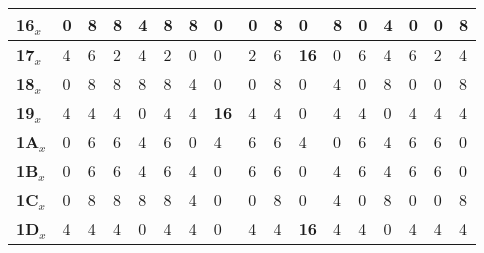 \begin{longtable}[c]{|l|l|l|l|l|l|l|l|l|l|l|l|l|l|l|l|l|}
\textbf{16$_x$} & 0              & 8              & 8              & 4              & 8              & 8              & 0              & 0              & 8              & 0              & 8              & 0              & 4              & 0              & 0              & 8              \\ \hline
\textbf{17$_x$} & 4              & 6              & 2              & 4              & 2              & 0              & 0              & 2              & 6              & \textbf{16}             & 0              & 6              & 4              & 6              & 2              & 4              \\ \hline
\textbf{18$_x$} & 0              & 8              & 8              & 8              & 8              & 4              & 0              & 0              & 8              & 0              & 4              & 0              & 8              & 0              & 0              & 8              \\ \hline
\textbf{19$_x$} & 4              & 4              & 4              & 0              & 4              & 4              & \textbf{16}             & 4              & 4              & 0              & 4              & 4              & 0              & 4              & 4              & 4              \\ \hline
\textbf{1A$_x$} & 0              & 6              & 6              & 4              & 6              & 0              & 4              & 6              & 6              & 4              & 0              & 6              & 4              & 6              & 6              & 0              \\ \hline
\textbf{1B$_x$} & 0              & 6              & 6              & 4              & 6              & 4              & 0              & 6              & 6              & 0              & 4              & 6              & 4              & 6              & 6              & 0              \\ \hline
\textbf{1C$_x$} & 0              & 8              & 8              & 8              & 8              & 4              & 0              & 0              & 8              & 0              & 4              & 0              & 8              & 0              & 0              & 8              \\ \hline
\textbf{1D$_x$} & 4              & 4              & 4              & 0              & 4              & 4              & 0              & 4              & 4              & \textbf{16}             & 4              & 4              & 0              & 4              & 4              & 4              \\ \hline

\end{longtable}
